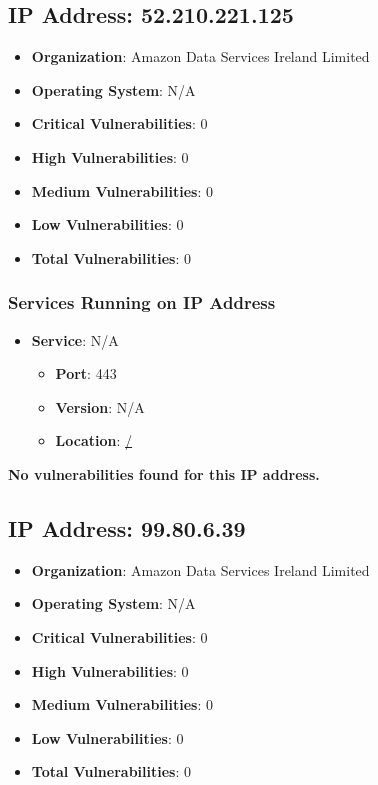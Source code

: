 \documentclass{article}
\begin{document}
\clearpage



\subsection{IP Address: 52.210.221.125}

\begin{itemize}
    \item \textbf{Organization}: Amazon Data Services Ireland Limited
    \item \textbf{Operating System}:  N/A 
    \item \textbf{Critical Vulnerabilities}: 0
    \item \textbf{High Vulnerabilities}: 0
    \item \textbf{Medium Vulnerabilities}: 0
    \item \textbf{Low Vulnerabilities}: 0
    \item \textbf{Total Vulnerabilities}: 0
\end{itemize}

\subsubsection*{Services Running on IP Address}

\begin{itemize}
    
        \item \textbf{Service}: N/A
        \begin{itemize}
            \item \textbf{Port}: 443
            \item \textbf{Version}:  N/A 
            \item \textbf{Location}: \href{ / }{ / }
        \end{itemize}
    
\end{itemize}


\textbf{No vulnerabilities found for this IP address.}




\clearpage



\subsection{IP Address: 99.80.6.39}

\begin{itemize}
    \item \textbf{Organization}: Amazon Data Services Ireland Limited
    \item \textbf{Operating System}:  N/A 
    \item \textbf{Critical Vulnerabilities}: 0
    \item \textbf{High Vulnerabilities}: 0
    \item \textbf{Medium Vulnerabilities}: 0
    \item \textbf{Low Vulnerabilities}: 0
    \item \textbf{Total Vulnerabilities}: 0
\end{itemize}
\end{document}
